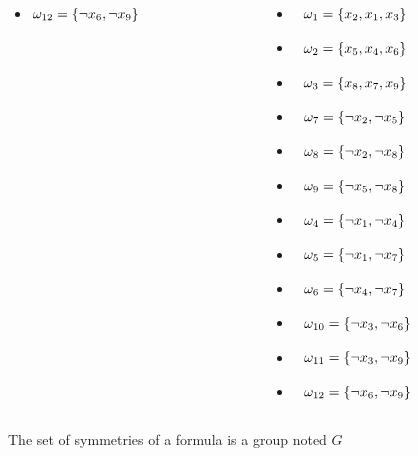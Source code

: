 \documentclass{beamer}
\begin{document}
\begin{frame}
\begin{columns}[t]
\begin{column}[T]{.3\textwidth}
\begin{itemize}
		\item[] $\omega_{12} = \{\neg x_6  ,  \neg x_9\} \tikz[baseline]{\node[anchor=base] (a12){};}$
		\end{itemize}
		\end{column}
		\begin{column}[T]{.3\textwidth}
		\tiny
		\begin{itemize}
		\item[] $\tikz[baseline]{\node[anchor=base] (b1){};} \omega_{1} = \{x_2  ,  x_1  ,  x_3\}$
		\item[] $\tikz[baseline]{\node[anchor=base] (b2){};} \omega_{2} = \{x_5  ,  x_4  ,  x_6\} $
		\item[] $\tikz[baseline]{\node[anchor=base] (b3){};} \omega_{3} = \{x_8  ,  x_7  ,  x_9\} $
		\item[] $\tikz[baseline]{\node[anchor=base] (b4){};} \omega_{7} = \{\neg x_2  ,  \neg x_5\} $
		\item[] $\tikz[baseline]{\node[anchor=base] (b5){};} \omega_{8} = \{\neg x_2  ,  \neg x_8\} $
		\item[] $\tikz[baseline]{\node[anchor=base] (b6){};} \omega_{9} = \{\neg x_5  ,  \neg x_8\} $
		\item[] $\tikz[baseline]{\node[anchor=base] (b7){};} \omega_{4} = \{\neg x_1  ,  \neg x_4\} $
		\item[] $\tikz[baseline]{\node[anchor=base] (b8){};} \omega_{5} = \{\neg x_1  ,  \neg x_7\} $
		\item[] $\tikz[baseline]{\node[anchor=base] (b9){};} \omega_{6} = \{\neg x_4  ,  \neg x_7\} $
		\item[] $\tikz[baseline]{\node[anchor=base] (b10){};} \omega_{10} = \{\neg x_3  ,  \neg x_6\} $
		\item[] $\tikz[baseline]{\node[anchor=base] (b11){};} \omega_{11} = \{\neg x_3  ,  \neg x_9\} $
		\item[] $\tikz[baseline]{\node[anchor=base] (b12){};} \omega_{12} = \{\neg x_6  ,  \neg x_9\} $
	\end{itemize}
	\end{column}
\end{columns}

\vfill
\normalsize
\centering The set of symmetries of a formula is a group noted $G$
%
\end{frame}
\end{document}
